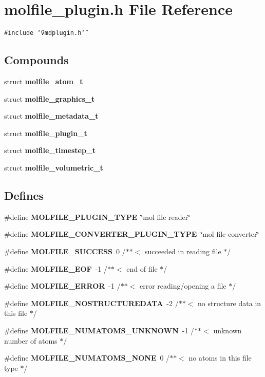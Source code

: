 \section{molfile\_\-plugin.h File Reference}
\label{molfile__plugin_8h}
{\tt \#include \char`\"{}vmdplugin.h\char`\"{}}\par
\subsection*{Compounds}
\begin{CompactItemize}
\item 
struct {\bf molfile\_\-atom\_\-t}
\item 
struct {\bf molfile\_\-graphics\_\-t}
\item 
struct {\bf molfile\_\-metadata\_\-t}
\item 
struct {\bf molfile\_\-plugin\_\-t}
\item 
struct {\bf molfile\_\-timestep\_\-t}
\item 
struct {\bf molfile\_\-volumetric\_\-t}
\end{CompactItemize}
\subsection*{Defines}
\begin{CompactItemize}
\item 
\#define {\bf MOLFILE\_\-PLUGIN\_\-TYPE}\ \char`\"{}mol file reader\char`\"{}
\item 
\#define {\bf MOLFILE\_\-CONVERTER\_\-PLUGIN\_\-TYPE}\ \char`\"{}mol file converter\char`\"{}
\item 
\#define {\bf MOLFILE\_\-SUCCESS}\ 0   /$\ast$$\ast$$<$ succeeded in reading file      $\ast$/
\item 
\#define {\bf MOLFILE\_\-EOF}\ -1   /$\ast$$\ast$$<$ end of file                    $\ast$/
\item 
\#define {\bf MOLFILE\_\-ERROR}\ -1   /$\ast$$\ast$$<$ error reading/opening a file   $\ast$/
\item 
\#define {\bf MOLFILE\_\-NOSTRUCTUREDATA}\ -2   /$\ast$$\ast$$<$ no structure data in this file $\ast$/
\item 
\#define {\bf MOLFILE\_\-NUMATOMS\_\-UNKNOWN}\ -1   /$\ast$$\ast$$<$ unknown number of atoms       $\ast$/
\item 
\#define {\bf MOLFILE\_\-NUMATOMS\_\-NONE}\ 0   /$\ast$$\ast$$<$ no atoms in this file type    $\ast$/
\end{CompactItemize}
